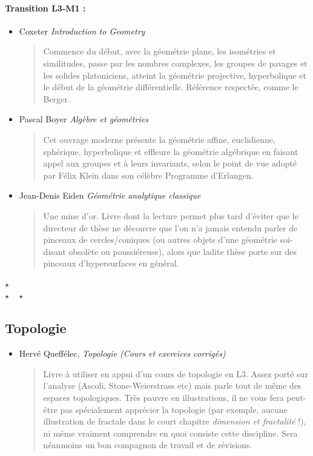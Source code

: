 \documentclass{article}
\def\separateur{\begin{center}
$\star$\\
$\star\quad\star$
\end{center}}
\begin{document}
\paragraph{Transition L3-M1 : }
\begin{itemize}
\item Coxeter \emph{Introduction to Geometry}
\begin{quote}
Commence du début, avec la géométrie plane, les isométries et similitudes, passe par les nombres complexes, les groupes de pavages et les solides platoniciens, atteint la géométrie projective, hyperbolique et le début de la géométrie différentielle. Référence respectée, comme le Berger.
\end{quote}
\item Pascal Boyer \emph{Algèbre et géométries}
\begin{quote}
Cet ouvrage moderne présente la géométrie affine, euclidienne, sphérique, hyperbolique et effleure la géométrie algébrique  en faisant appel aux groupes et à leurs invariants, selon le point de vue adopté par Félix Klein dans son célèbre \og Programme d'Erlangen\fg.
\end{quote}
\item Jean-Denis Eiden \emph{Géométrie analytique classique}
\begin{quote}
Une mine d'or. Livre dont la lecture permet plus tard d'éviter que le directeur de thèse ne découvre que l'on n'a jamais entendu parler de  pinceaux de cercles/coniques (ou autres objets d'une géométrie soi-disant obsolète ou \og poussiéreuse\fg), alors que ladite thèse porte sur des pinceaux d'hypersurfaces en général.
\end{quote}
\end{itemize}

\separateur
\subsection{Topologie}


\begin{mdframed}
\begin{itemize}
\item Hervé Queffélec, \emph{Topologie (Cours et exercices corrigés)}
\begin{quote}
Livre à utiliser en appui d'un cours de topologie en L3. 	Assez porté sur l'analyse (Ascoli, Stone-Weierstrass etc) mais parle tout de même des espaces topologiques. Très pauvre en illustrations, il ne vous fera peut-être pas spécialement apprécier la topologie (par exemple, aucune illustration de fractale dans le court chapitre \emph{dimension et fractalité} !), ni même vraiment comprendre en quoi consiste cette discipline. Sera néanmoins un  bon compagnon de travail et de révisions.
\end{quote}
\end{itemize} 
\end{mdframed}
\end{document}
